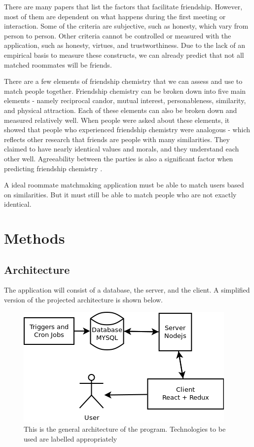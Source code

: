\documentclass[journal]{./IEEE/IEEEtran}
\begin{document}
There are many papers that list the factors that facilitate friendship. However, most of them are dependent on what happens during the first meeting or interaction. Some of the criteria are subjective, such as honesty, which  vary from person to person. Other criteria cannot be controlled or measured with the application, such as honesty, virtues, and trustworthiness. Due to the lack of an empirical basis to measure these constructs, we can already predict that not all matched roommates will be friends.

There are a few elements of friendship chemistry that we can assess and use to match people together. Friendship chemistry can be broken down into five main elements - namely reciprocal candor, mutual interest, personableness, similarity, and physical attraction\cite{f_chemistry}. Each of these elements can also be broken down and measured relatively well. When people were asked about these elements, it showed that people who experienced friendship chemistry were analogous\cite{f_chemistry} - which reflects other research that friends are people with many similarities\cite{similar}. They claimed to have nearly identical values and morals, and they understand each other well\cite{f_chemistry}. Agreeability between the parties is also a significant factor when predicting friendship chemistry \cite{f_chemistry}.

A ideal roommate matchmaking application must be able to match users based on similarities. But it must still be able to match people who are not exactly identical.

\section{Methods}

\subsection{Architecture}
The application will consist of a database, the server, and the client. A simplified version of the projected architecture is shown below.
\\
\begin{figure}[h]
\centering
\includegraphics[scale=0.5]{Architecture}
\caption{This is the general architecture of the program. Technologies to be used are labelled appropriately}
\end{figure}
\end{document}
